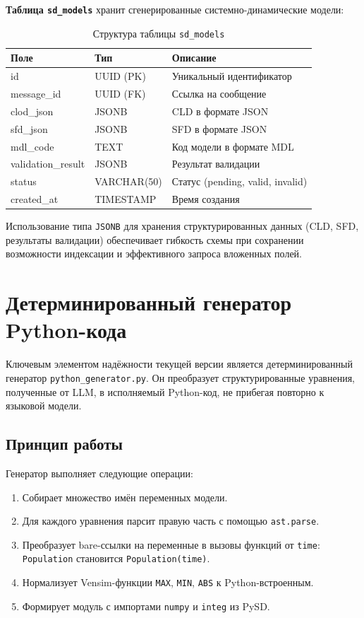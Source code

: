 \textbf{Таблица \texttt{sd\_models}} хранит сгенерированные системно-динамические модели:

\begin{table}[H]
    \centering
    \caption{Структура таблицы \texttt{sd\_models}}
    \begin{tabular}{|l|l|l|}
        \hline
        \textbf{Поле} & \textbf{Тип} & \textbf{Описание} \\
        \hline
        id & UUID (PK) & Уникальный идентификатор \\
        \hline
        message\_id & UUID (FK) & Ссылка на сообщение \\
        \hline
        clod\_json & JSONB & CLD в формате JSON \\
        \hline
        sfd\_json & JSONB & SFD в формате JSON \\
        \hline
        mdl\_code & TEXT & Код модели в формате MDL \\
        \hline
        validation\_result & JSONB & Результат валидации \\
        \hline
        status & VARCHAR(50) & Статус (pending, valid, invalid) \\
        \hline
        created\_at & TIMESTAMP & Время создания \\
        \hline
    \end{tabular}
\end{table}

Использование типа \texttt{JSONB} для хранения структурированных данных (CLD, SFD, результаты валидации) обеспечивает гибкость схемы при сохранении возможности индексации и эффективного запроса вложенных полей.


\section{Детерминированный генератор Python-кода}

Ключевым элементом надёжности текущей версии является детерминированный генератор \texttt{python\_generator.py}. Он преобразует структурированные уравнения, полученные от LLM, в исполняемый Python-код, не прибегая повторно к языковой модели.

\subsection{Принцип работы}

Генератор выполняет следующие операции:

\begin{enumerate}
    \item Собирает множество имён переменных модели.
    \item Для каждого уравнения парсит правую часть с помощью \texttt{ast.parse}.
    \item Преобразует bare-ссылки на переменные в вызовы функций от \texttt{time}: \texttt{Population} становится \texttt{Population(time)}.
    \item Нормализует Vensim-функции \texttt{MAX}, \texttt{MIN}, \texttt{ABS} к Python-встроенным.
    \item Формирует модуль с импортами \texttt{numpy} и \texttt{integ} из PySD.
\end{enumerate}

